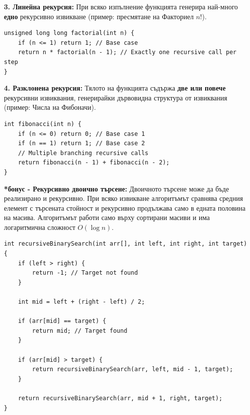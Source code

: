 \documentclass{scrartcl}
\begin{document}
\begin{FlushLeft}
\textbf{3. Линейна рекурсия:} При всяко изпълнение функцията генерира най-много \textbf{едно} рекурсивно извикване (пример: пресмятане на Факториел $n!$).
\begin{lstlisting}
unsigned long long factorial(int n) {
    if (n <= 1) return 1; // Base case
    return n * factorial(n - 1); // Exactly one recursive call per step
}
\end{lstlisting}

\textbf{4. Разклонена рекурсия:} Тялото на функцията съдържа \textbf{две или повече} рекурсивни извиквания, генерирайки дървовидна структура от извиквания (пример: Числа на Фибоначи).
\begin{lstlisting}
int fibonacci(int n) {
    if (n <= 0) return 0; // Base case 1
    if (n == 1) return 1; // Base case 2
    // Multiple branching recursive calls
    return fibonacci(n - 1) + fibonacci(n - 2); 
}
\end{lstlisting}

\textbf{*бонус - Рекурсивно двоично търсене:} 
Двоичното търсене може да бъде реализирано и рекурсивно. 
При всяко извикване алгоритъмът сравнява средния елемент с търсената стойност и рекурсивно продължава само в едната половина на масива. 
Алгоритъмът работи само върху сортирани масиви и има логаритмична сложност $O(\log n)$.

\begin{lstlisting}
int recursiveBinarySearch(int arr[], int left, int right, int target) {
    if (left > right) {
        return -1; // Target not found
    }
    
    int mid = left + (right - left) / 2;
    
    if (arr[mid] == target) {
        return mid; // Target found
    }
    
    if (arr[mid] > target) {
        return recursiveBinarySearch(arr, left, mid - 1, target);
    }
    
    return recursiveBinarySearch(arr, mid + 1, right, target);
}
\end{lstlisting}

\end{FlushLeft}
\end{document}
